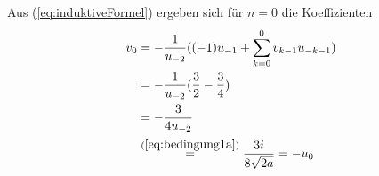 Aus (\ref{eq:induktiveFormel}) ergeben sich für $n=0$ die Koeffizienten
\begin{align*}
v_{0} &= -\frac{1}{u_{-2}} ((-1)u_{-1} + \sum_{k=0}^{0} v_{k-1}u_{-k-1})
\\&= -\frac{1}{u_{-2}} (\frac{3}{2} - \frac{3}{4})
\\&= -\frac{3}{4u_{-2}}
\\&\overset{(\ref{eq:bedingung1a})}{=} \frac{3i}{8\sqrt{2a}} = -u_{0}
\end{align*}
  \begin{comment}
  Somit ergeben sich für $n=1$ die Koeffizienten
  \begin{align*}
  v_1 &= -\frac{1}{u_{-2}}
    ((1-1)u_{1-1} + \sum_{k=0}^{1} v_{k-1}u_{1-k-1})
  \\&= -\frac{1}{u_{-2}} (v_{-1}u_{0} + v_{0}u_{-1})
  \\&= -\frac{v_0}{u_{-2}} (-v_{-1} + u_{-1})
  \\&= \frac{3}{u_{-2}\cdot 4u_{-2}} (-\frac{1}{2} - \frac{3}{2})
  \\&= \frac{3}{4u_{-2}^2} (-2)
  \\&= -\frac{3}{2u_{-2}^2}
  \\&= \frac{3}{16a} = -u_1
  & \overset{a=\frac{1}{8}}{=} 1.5
  \end{align*}
  und für $n=2$ ist
  \begin{align*}
  v_2 &=-\frac{1}{u_{-2}} ((2-1)u_{2-1} + \sum_{k=0}^{2} v_{k-1}u_{2-k-1})
  \\&=-\frac{1}{u_{-2}} (u_{1} + v_{-1}u_{1} + v_{0}u_{0} + v_{1}u_{-1})
  \\&=-\frac{1}{u_{-2}} (\frac{3}{2u_{-2}^2}
    + \frac{1}{2}\frac{3}{2u_{-2}^2}
    + \frac{-3}{4u_{-2}}\frac{3}{4u_{-2}}
    + \frac{-3}{2u_{-2}^2}\frac{-3}{2})
  \\&=-\frac{1}{u_{-2}^3} (\frac{24}{16}
    + \frac{12}{16}
    -\frac{9}{16}
    + \frac{36}{16})
  \\&=-\frac{63}{16u_{-2}^3} 
  \\&=-\frac{63}{16(2i\sqrt{2a})^3} 
  \\&=\frac{63}{256ia\sqrt{2a}} 
  \\&=-\frac{63}{256a\sqrt{2a}} = -u_2
  & \overset{a=\frac{1}{8}}{\approx} -3.9375i
  \end{align*}
  und für $n=3$ ist
  \begin{align*}
  v_3 &=-\frac{1}{u_{-2}} ((3-1)u_{3-1} + \sum_{k=0}^{3} v_{k-1}u_{3-k-1})
  \\&\approx -u_{-2}^{-4}(\underbracket{-\frac{63}{8}-\frac{1}{2}v_2}
    -v_0v_1-v_1v_0-\frac{3}{2}v_2)
  \\&=-u_{-2}^{-4}(\overbracket{-\frac{(4-1)63}{32}}
    -2\frac{-3}{4}\frac{-3}{2}-\frac{3}{2}\frac{-63}{16})
  \\&=-\frac{-(4-1)63-8\cdot9+3\cdot63}{32u_{-2}^{4}}
  \\&=-\frac{-8\cdot9}{8\cdot 4u_{-2}^{4}}
  \\&=\frac{9}{4u_{-2}^{4}}
  \end{align*}
  \end{comment}
